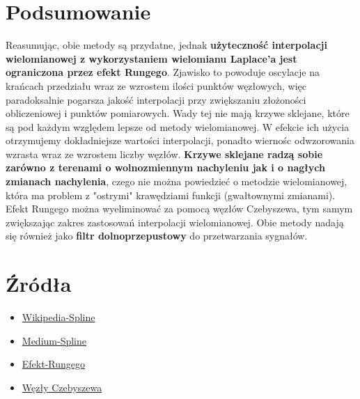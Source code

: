 \documentclass{article}
\begin{document}
\section{Podsumowanie}
Reasumując, obie metody są przydatne, jednak \textbf{użyteczność interpolacji wielomianowej z wykorzystaniem wielomianu Laplace'a jest ograniczona przez 
efekt Rungego}. Zjawisko to powoduje oscylacje na krańcach przedziału wraz ze wzrostem ilości punktów węzłowych, więc paradoksalnie pogarsza jakość interpolacji
przy zwiększaniu złożoności  obliczeniowej i punktów pomiarowych. Wady tej nie mają krzywe sklejane, które są pod każdym względem lepsze od metody wielomianowej.
W efekcie ich użycia otrzymujemy dokładniejsze wartości interpolacji, ponadto wiernośc odwzorowania wzrasta wraz ze wzrostem liczby węzłów.  \textbf{Krzywe sklejane
radzą sobie zarówno z terenami o wolnozmiennym nachyleniu jak i o nagłych zmianach nachylenia}, czego nie można powiedzieć o metodzie wielomianowej, która 
ma problem z "ostrymi" krawędziami funkcji (gwałtownymi zmianami). Efekt Rungego można wyeliminować za pomocą węzłów Czebyszewa, tym samym zwiększając
zakres zastosowań interpolacji wielomianowej. Obie metody nadają się również jako \textbf{filtr dolnoprzepustowy} do przetwarzania sygnałów. 
\section{Źródła}
\begin{itemize}
	\item \href{https://en.wikipedia.org/w/index.php?title=Spline_%28mathematics%29&oldid=288288033#Algorithm_for_computing_natural_cubic_splines}{Wikipedia-Spline}
	\item \href{https://medium.com/eatpredlove/natural-cubic-splines-implementation-with-python-edf68feb57aa}{Medium-Spline}
	\item \href{https://pl.wikipedia.org/wiki/Efekt_Rungego}{Efekt-Rungego}
	\item \href{https://byc-matematykiem.pl/tajniki-interpolacji-czesc-9/}{Węzły Czebyszewa}
\end{itemize}
\end{document}
